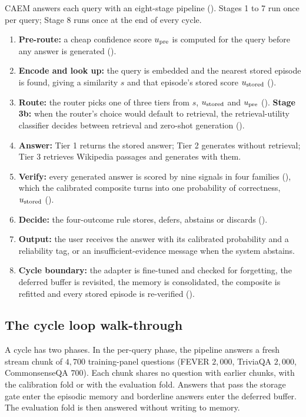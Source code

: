 CAEM answers each query with an eight-stage pipeline (). Stages 1 to 7 run once per query; Stage 8 runs once at the end of every cycle.
\begin{enumerate}
    \item \textbf{Pre-route:} a cheap confidence score $u_{\text{pre}}$ is computed for the query before any answer is generated ().
    \item \textbf{Encode and look up:} the query is embedded and the nearest stored episode is found, giving a similarity $s$ and that episode's stored score $u_{\text{stored}}$ ().
    \item \textbf{Route:} the router picks one of three tiers from $s$, $u_{\text{stored}}$ and $u_{\text{pre}}$ (). \textbf{Stage 3b:} when the router's choice would default to retrieval, the retrieval-utility classifier decides between retrieval and zero-shot generation ().
    \item \textbf{Answer:} Tier 1 returns the stored answer; Tier 2 generates without retrieval; Tier 3 retrieves Wikipedia passages and generates with them.
    \item \textbf{Verify:} every generated answer is scored by nine signals in four families (), which the calibrated composite turns into one probability of correctness, $u_{\text{stored}}$ ().
    \item \textbf{Decide:} the four-outcome rule stores, defers, abstains or discards ().
    \item \textbf{Output:} the user receives the answer with its calibrated probability and a reliability tag, or an insufficient-evidence message when the system abstains.
    \item \textbf{Cycle boundary:} the adapter is fine-tuned and checked for forgetting, the deferred buffer is revisited, the memory is consolidated, the composite is refitted and every stored episode is re-verified ().
\end{enumerate}

\subsection{The cycle loop walk-through}
\label{sec:overview-cycle}

A cycle has two phases. In the per-query phase, the pipeline answers a fresh stream chunk of $4{,}700$ training-panel questions (FEVER $2{,}000$, TriviaQA $2{,}000$, CommonsenseQA $700$). Each chunk shares no question with earlier chunks, with the calibration fold or with the evaluation fold. Answers that pass the storage gate enter the episodic memory and borderline answers enter the deferred buffer. The evaluation fold is then answered without writing to memory.

